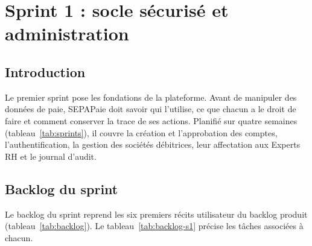 \chapter{Sprint 1 : socle sécurisé et administration}
\label{ch:sprint1}
\startcontents[chapters]
\chapterplan

\section{Introduction}

Le premier sprint pose les fondations de la plateforme. Avant de manipuler des données de paie, SEPAPaie doit savoir qui l'utilise, ce que chacun a le droit de faire et comment conserver la trace de ses actions. Planifié sur quatre semaines (tableau~\ref{tab:sprints}), il couvre la création et l'approbation des comptes, l'authentification, la gestion des sociétés débitrices, leur affectation aux Experts RH et le journal d'audit.

\section{Backlog du sprint}

Le backlog du sprint reprend les six premiers récits utilisateur du backlog produit (tableau~\ref{tab:backlog}). Le tableau~\ref{tab:backlog-s1} précise les tâches associées à chacun.

